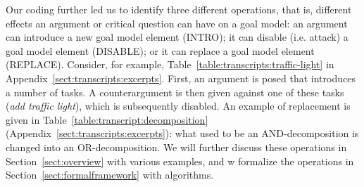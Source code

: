 Our coding further led us to identify three different operations, that is, different effects an argument or critical question can have on a goal model: an argument can introduce a new goal model element (\textsf{INTRO}); it can disable (i.e. attack) a goal model element (\textsf{DISABLE}); or it can replace a goal model element (\textsf{REPLACE}). Consider, for example, Table~\ref{table:transcripts:traffic-light} in Appendix~\ref{sect:transcripts:excerpts}. First, an argument is posed that introduces a number of tasks. A counterargument is then given against one of these tasks (\emph{add traffic light}), which is subsequently disabled. An example of replacement is given in Table~\ref{table:transcript:decomposition} (Appendix~\ref{sect:transcripts:excerpts}): what used to be an AND-decomposition is changed into an OR-decomposition. We will further discuss these operations in Section~\ref{sect:overview} with various examples, and w formalize the operations in Section~\ref{sect:formalframework} with algorithms.